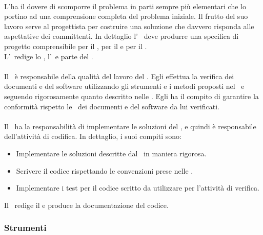 \paragraph{\An}
L'\An ha il dovere di scomporre il problema in parti sempre più elementari che lo portino ad una comprensione completa del problema iniziale.
Il frutto del suo lavoro serve al progettista per costruire una soluzione che davvero risponda alle aspettative dei committenti.
In dettaglio l' \An\ deve produrre una specifica di progetto comprensibile per il , per il  e per il \Prog. \\
L'\An\ redige lo \SdF, l'\AdR\ e parte del \PdQ.

\paragraph{\Ver}
Il \Ver\ è responsabile della qualità del lavoro del .
Egli effettua la verifica dei documenti e del software utilizzando gli strumenti e i metodi proposti nel
\PdQ\ e seguendo rigorosamente quanto descritto nelle \NdP.
Egli ha il compito di garantire la conformità rispetto le \NdP\ dei documenti e del software da lui verificati.

\paragraph{\Progr}
Il \Progr\ ha la responsabilità di implementare le soluzioni del \Prog, e quindi è
responsabile dell'attività di codifica. In dettaglio, i suoi compiti sono:
\begin{itemize}
  \item Implementare le soluzioni descritte dal \Prog\ in maniera rigorosa.
  \item Scrivere il codice rispettando le convenzioni prese nelle \NdP.
  \item Implementare i test per il codice scritto da utilizzare per l'attività di verifica.
\end{itemize}
Il \Progr\ redige il \MU e produce la documentazione del codice.

\subsubsection{Strumenti}

